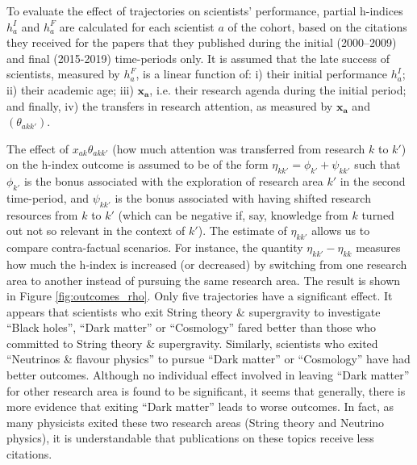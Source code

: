 \documentclass{article}
\begin{document}
To evaluate the effect of trajectories on scientists' performance, partial h-indices $h_a^{I}$ and $h_a^{F}$ are calculated for each scientist $a$ of the cohort, based on the citations they received for the papers that they published during the initial (2000--2009) and final (2015-2019) time-periods only. It is assumed that the late success of scientists, measured by $h_a^{F}$, is a linear function of: i) their initial performance $h_a^{I}$; ii) their academic age; iii) $\bm{x_a}$, i.e. their research agenda during the initial period; and finally, iv) the transfers in research attention, as measured by $\bm{x_a}$ and $(\theta_{akk'})$.


The effect of $x_{ak}\theta_{akk'}$ (how much attention was transferred from research $k$ to $k'$) on the h-index outcome is assumed to be of the form $\eta_{kk'} = \phi_{k'} + \psi_{kk'}$ such that $\phi_{k'}$ is the bonus associated with the exploration of research area $k'$ in the second time-period, and $\psi_{kk'}$ is the bonus associated with having shifted research resources from $k$ to $k'$ (which can be negative if, say, knowledge from $k$ turned out not so relevant in the context of $k'$). The estimate of $\eta_{kk'}$ allows us to compare contra-factual scenarios. For instance, the quantity $\eta_{kk'}-\eta_{kk}$ measures how much the h-index is increased (or decreased) by switching from one research area to another instead of pursuing the same research area. The result is shown in Figure \ref{fig:outcomes_rho}. Only five trajectories have a significant effect. It appears that scientists who exit String theory \& supergravity to investigate ``Black holes'', ``Dark matter'' or ``Cosmology'' fared better than those who committed to String theory \& supergravity. Similarly, scientists who exited ``Neutrinos \& flavour physics'' to pursue ``Dark matter'' or ``Cosmology'' have had better outcomes. Although no individual effect involved in leaving ``Dark matter'' for other research area is found to be significant, it seems that generally, there is more evidence that exiting ``Dark matter'' leads to worse outcomes. In fact, as many physicists exited these two research areas (String theory and Neutrino physics), it is understandable that publications on these topics receive less citations. 
\end{document}
